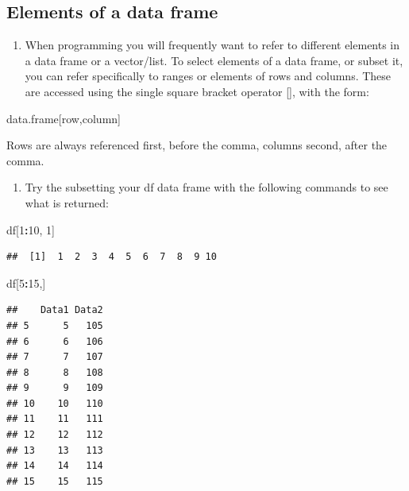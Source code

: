 \documentclass[]{book}
\newenvironment{Shaded}{\begin{snugshade}}{\end{snugshade}}
\newcommand{\DecValTok}[1]{\textcolor[rgb]{0.00,0.00,0.81}{#1}}
\newcommand{\NormalTok}[1]{#1}
\newcommand{\OperatorTok}[1]{\textcolor[rgb]{0.81,0.36,0.00}{\textbf{#1}}}
\providecommand{\tightlist}{%
  \setlength{\itemsep}{0pt}\setlength{\parskip}{0pt}}
\begin{document}
\hypertarget{elements-of-a-data-frame}{%
\subsection{Elements of a data frame}\label{elements-of-a-data-frame}}

\begin{enumerate}
\def\labelenumi{\arabic{enumi}.}
\setcounter{enumi}{18}
\tightlist
\item
  When programming you will frequently want to refer to different elements in a data frame or a vector/list. To select elements of a data frame, or subset it, you can refer specifically to ranges or elements of rows and columns. These are accessed using the single square bracket operator {[}{]}, with the form:
\end{enumerate}

\begin{Shaded}
\begin{Highlighting}[]
\NormalTok{data.frame[row,column]}
\end{Highlighting}
\end{Shaded}

Rows are always referenced first, before the comma, columns second, after the comma.

\begin{enumerate}
\def\labelenumi{\arabic{enumi}.}
\setcounter{enumi}{19}
\tightlist
\item
  Try the subsetting your df data frame with the following commands to see what is returned:
\end{enumerate}

\begin{Shaded}
\begin{Highlighting}[]
\NormalTok{df[}\DecValTok{1}\OperatorTok{:}\DecValTok{10}\NormalTok{, }\DecValTok{1}\NormalTok{]}
\end{Highlighting}
\end{Shaded}

\begin{verbatim}
##  [1]  1  2  3  4  5  6  7  8  9 10
\end{verbatim}

\begin{Shaded}
\begin{Highlighting}[]
\NormalTok{df[}\DecValTok{5}\OperatorTok{:}\DecValTok{15}\NormalTok{,]}
\end{Highlighting}
\end{Shaded}

\begin{verbatim}
##    Data1 Data2
## 5      5   105
## 6      6   106
## 7      7   107
## 8      8   108
## 9      9   109
## 10    10   110
## 11    11   111
## 12    12   112
## 13    13   113
## 14    14   114
## 15    15   115
\end{verbatim}
\end{document}
